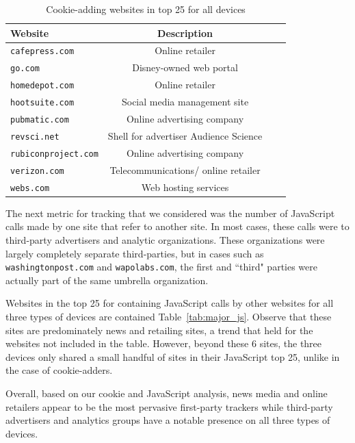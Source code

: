 \documentclass{acm_proc_article-sp}
\begin{document}
\begin{table}[htbp]
  \centering
  \caption{Cookie-adding websites in top 25 for all devices}
    \begin{tabular}{|c|c|c|c|}
    \hline
     \multicolumn{1}{|l|}{\textbf{Website}} & \textbf{Description}    \\ \hline
    \multicolumn{1}{|l|}{\texttt{cafepress.com}} & Online retailer   \\
    \multicolumn{1}{|l|}{\texttt{go.com}} & Disney-owned web portal  \\
    \multicolumn{1}{|l|}{\texttt{homedepot.com}} & Online retailer    \\
    \multicolumn{1}{|l|}{\texttt{hootsuite.com}} & Social media management site   \\
    \multicolumn{1}{|l|}{\texttt{pubmatic.com}} & Online advertising company   \\
    \multicolumn{1}{|l|}{\texttt{revsci.net}} & Shell for advertiser Audience Science    \\
    \multicolumn{1}{|l|}{\texttt{rubiconproject.com}} & Online advertising company   \\
    \multicolumn{1}{|l|}{\texttt{verizon.com}} & Telecommunications/ online retailer   \\
    \multicolumn{1}{|l|}{\texttt{webs.com}} & Web hosting services  \\ \hline
    \end{tabular}%
  \label{tab:major_cookies}%
\end{table}%

The next metric for tracking that we considered was the number of JavaScript calls made by one site that refer to another site. In most cases, these calls were to third-party advertisers and analytic organizations. These organizations were largely completely separate third-parties, but in cases such as \texttt{washingtonpost.com} and \texttt{wapolabs.com}, the first and  ``third" parties were actually part of the same umbrella organization. 

Websites in the top 25 for containing JavaScript calls by other websites for all three types of devices are contained Table~\ref{tab:major_js}. Observe that these sites are predominately news and retailing sites, a trend that held for the websites not included in the table. However, beyond these 6 sites, the three devices only shared a small handful of sites in their JavaScript top 25, unlike in the case of cookie-adders.

Overall, based on our cookie and JavaScript analysis, news media and online retailers appear to be the most pervasive first-party trackers while third-party advertisers and analytics groups have a notable presence on all three types of devices.
\end{document}
